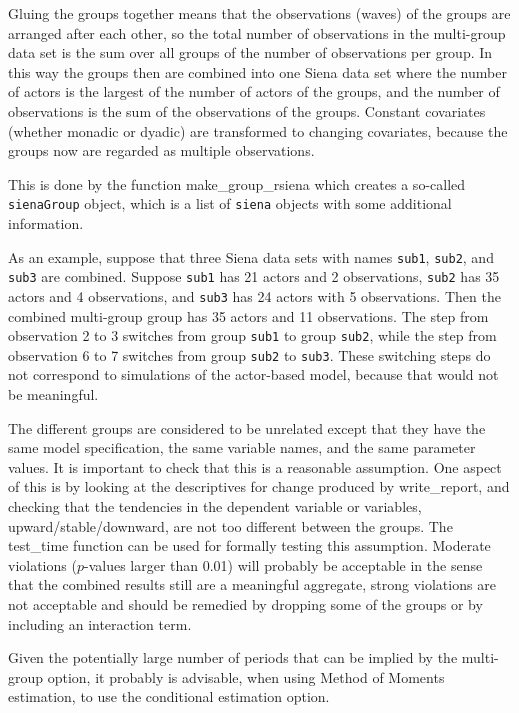 \documentclass[a4paper,fleqn,11pt]{article}
\newcommand{\+}{\, + \,}
\begin{document}
Gluing the groups together means that the observations (waves) of the groups
are arranged after each other, so the total number of observations
in the multi-group data set is the sum over all groups of the
number of observations per group. In this way
the groups then are combined into one Siena data set
where the number of actors is the largest of the number of
actors of the groups, and the number of observations
is the sum of the observations of the groups.
Constant covariates (whether monadic or dyadic) are transformed
to changing covariates, because the groups now are regarded
as multiple observations.

This is done by the function \textsf{make\_group\_rsiena} which creates
a so-called \texttt{sienaGroup} object, which is a list of
\texttt{siena} objects with some additional information.

As an example, suppose that three Siena data sets with names {\tt sub1}, {\tt sub2},
and {\tt sub3} are combined. Suppose {\tt sub1} has 21 actors and
2 observations, {\tt sub2} has 35 actors and 4 observations,
and {\tt sub3} has 24 actors with 5 observations.
Then the combined multi-group group has 35 actors and 11 observations.
The step from observation 2 to 3 switches from group {\tt sub1}
to group {\tt sub2}, while
the step from observation 6 to 7 switches from group {\tt sub2}
to {\tt sub3}. These switching steps do not correspond to simulations
of the actor-based model, because that would not be meaningful.

The different groups are considered to be unrelated
except that they have the same model specification,
the same variable names, and the same parameter values.
It is important to check that this is a reasonable assumption.
One aspect of this is by looking at the descriptives for change
produced by \textsf{write\_report}, and checking that the
tendencies in the dependent variable or variables, upward/stable/downward,
are not too different between the groups.
The \textsf{test\_time} function can be used for
formally testing this assumption.
Moderate violations ($p$-values larger than 0.01) will probably
be acceptable in the sense that the combined results
still are a meaningful aggregate, strong violations are not acceptable
and should be remedied by dropping some of the groups or by
including an interaction term.

Given the potentially large number of periods that can be implied
by the multi-group option, it probably is advisable,
when using Method of Moments estimation, to use
the conditional estimation option.
\end{document}
